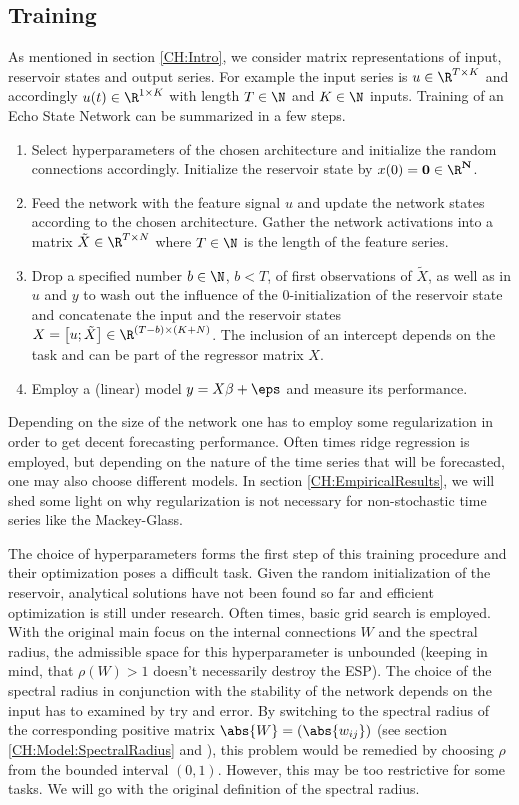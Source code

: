 \subsection{Training}
As mentioned in section \ref{CH:Intro}, we consider matrix representations of input, reservoir states and output series. For example the input series is $u \in \R^{T\times K}$ and accordingly $u(t) \in \R^{1\times K}$ with length $T\in\N$ and $K\in\N$ inputs.
Training of an Echo State Network can be summarized in a few steps. 
\begin{enumerate}
\item Select hyperparameters of the chosen architecture and initialize the random connections accordingly. Initialize the reservoir state by $x(0) = \bf{0} \in \R^{N}$.
\item Feed the network with the feature signal $u$ and update the network states according to the chosen architecture. Gather the network activations into a matrix $\tilde X \in \R^{T\times N}$ where $T\in \N$ is the length of the feature series.
\item Drop a specified number $b \in \N$, $b < T$, of first observations of $\tilde X$, as well as in $u$ and $y$ to wash out the influence of the 0-initialization of the reservoir state and concatenate the input and the reservoir states $X = \left[u; \tilde X\right] \in \R^{(T-b)\times(K+N)}$. The inclusion of an intercept depends on the task and can be part of the regressor matrix $X$.
\item Employ a (linear) model $y = X\beta + \eps$ and measure its performance.
\end{enumerate}
Depending on the size of the network one has to employ some regularization in order to get decent forecasting performance. Often times ridge regression is employed, but depending on the nature of the time series that will be forecasted, one may also choose different models. In section \ref{CH:EmpiricalResults}, we will shed some light on why regularization is not necessary for non-stochastic time series like the Mackey-Glass.


The choice of hyperparameters forms the first step of this training procedure and their optimization poses a difficult task. Given the random initialization of the reservoir, analytical solutions have not been found so far and efficient optimization is still under research. Often times, basic grid search is employed. With the original main focus on the internal connections $W$ and the spectral radius, the admissible space for this hyperparameter is unbounded (keeping in mind, that $\rho(W) > 1$ doesn't necessarily destroy the ESP). The choice of the spectral radius in conjunction with the stability of the network depends on the input has to examined by try and error. By switching to the spectral radius of the corresponding positive matrix $\abs{W} = \left(\abs{w_{ij}}\right)$ (see section \ref{CH:Model:SpectralRadius} and \citep{YILDIZ20121}), this problem would be remedied by choosing $\rho$ from the bounded interval $(0,1)$. However, this may be too restrictive for some tasks. We will go with the original definition of the spectral radius.

